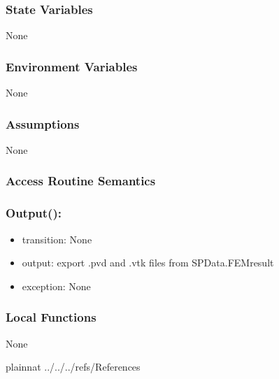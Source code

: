 \documentclass[12pt, titlepage]{article}
\begin{document}
	\subsubsection{State Variables} None
	
	\subsubsection{Environment Variables} None
	
	\subsubsection{Assumptions} None
	
	\subsubsection{Access Routine Semantics}
	
	\subsubsection*{Output():} \begin{itemize} \item transition: None \item output: export .pvd and .vtk files from SPData.FEMresult \item exception: None \end{itemize}
	

	\subsubsection{Local Functions} None
	
	\newpage %
	
	
	 {plainnat}  {../../../refs/References}
	
	
	
\end{document}
